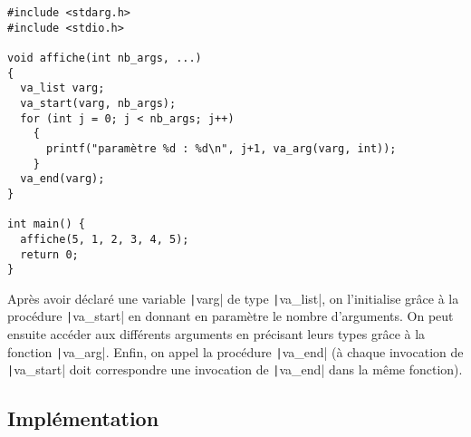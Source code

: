 \documentclass[a4paper]{article}
\begin{document}
\begin{verbatim}
#include <stdarg.h>
#include <stdio.h>

void affiche(int nb_args, ...)
{
  va_list varg;
  va_start(varg, nb_args);
  for (int j = 0; j < nb_args; j++)
    {      
      printf("paramètre %d : %d\n", j+1, va_arg(varg, int));
    }
  va_end(varg);
}

int main() {
  affiche(5, 1, 2, 3, 4, 5);
  return 0;
}
\end{verbatim}

Après avoir déclaré une variable \texttt|varg| de type \texttt|va_list|, on l'initialise grâce à la procédure \texttt|va_start| en donnant
en paramètre le nombre d'arguments. On peut ensuite accéder aux différents arguments en précisant leurs types grâce à la fonction
\texttt|va_arg|. Enfin, on appel la procédure \texttt|va_end| (à chaque invocation de \texttt|va_start| doit correspondre une invocation de \texttt|va_end| dans la même fonction).

\subsection{Implémentation}
\end{document}
